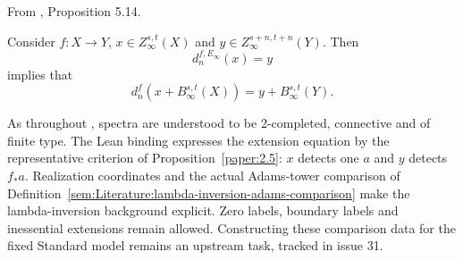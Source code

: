 
\begin{proposition}
\label{paper:5.14}
From \cite{LWX126}, Proposition 5.14.\par
Consider $f: X\to Y$, $x\in Z_\infty^{s,t}(X)$ and $y\in Z_\infty^{s+n,t+n}(Y)$.
    Then
    $$d^{f,E_\infty}_n(x)=y$$
    implies that
    $$d^{f}_n(x+B_\infty^{s,t}(X))=y+B_\infty^{s,t}(Y).$$

As throughout \cite{LWX126}, spectra are understood to be 2-completed,
connective and of finite type. The Lean binding expresses the extension
equation by the representative criterion of Proposition~\ref{paper:2.5}:
$x$ detects one $a$ and $y$ detects $f_*a$. Realization coordinates and
the actual Adams-tower comparison of
Definition~\ref{sem:Literature:lambda-inversion-adams-comparison} make the
lambda-inversion background explicit. Zero labels, boundary labels and
inessential extensions remain allowed. Constructing these comparison
data for the fixed Standard model remains an upstream task, tracked in
issue 31.


\end{proposition}

